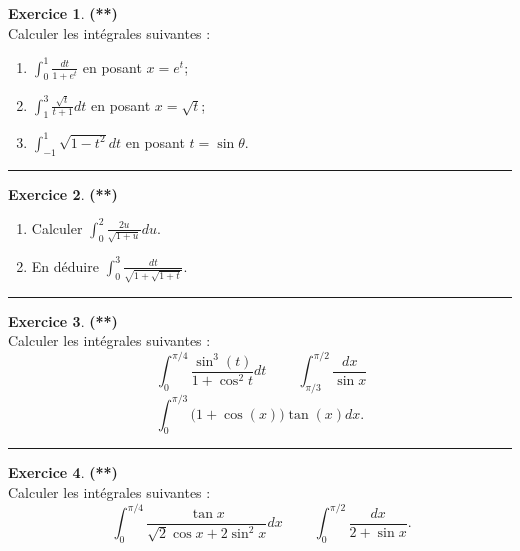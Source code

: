 \documentclass[a4paper,11pt]{article}
\theoremstyle{definition}
\newtheorem{exo}{Exercice} %
\begin{document}
\begin{minipage}{1\linewidth}
\begin{minipage}[t]{0.48\linewidth}
\begin{exo}\textbf{(**)}\quad\\[0.2cm]
	
Calculer les intégrales suivantes :
\begin{enumerate}
	\item  $\displaystyle \int_0^1\frac{dt}{1+e^t}$ en posant $x=e^t$;
	\item $\displaystyle \int_1^3\frac{\sqrt t}{t+1}dt$ en posant $x=\sqrt t$;
	\item $\displaystyle \int_{-1}^1 \sqrt{1-t^2}dt$ en posant $t=\sin\theta$.
\end{enumerate}
	
	
	\centering
	\rule{1\linewidth}{0.6pt}
\end{exo}

\begin{exo}\textbf{(**)}\quad\\[0.2cm]
	\begin{enumerate}
		\item Calculer $\displaystyle\int_0^2 \frac{2u}{\sqrt{1+u}}du$.
		\item En déduire $\displaystyle \int_0^{3}\frac{dt}{\sqrt{1+\sqrt{1+t}}}$.
	\end{enumerate}	
	
	
	\centering
	\rule{1\linewidth}{0.6pt}
\end{exo}

\begin{exo}\textbf{(**)}\quad\\[0.2cm]
	Calculer les intégrales suivantes :
	$$\ \int_0^{\pi/4}\frac{\sin^3(t)}{1+\cos^2 t}dt\quad\quad\ \int_{\pi/3}^{\pi/2}\frac{dx}{\sin x}$$ $$ \int_0^{\pi/3}\big(1+\cos(x)\big)\tan(x)dx.$$
	
	\centering
	\rule{1\linewidth}{0.6pt}
\end{exo}




\end{minipage}	
\hfill\vrule\hfill
\begin{minipage}[t]{0.48\linewidth}
\raggedright



\begin{exo}\textbf{(**)}\quad\\[0.1cm]
	Calculer les intégrales suivantes :
	$$\ \int_0^{\pi/4}\frac{\tan x}{\sqrt 2\cos x+2\sin^2 x}dx\quad\quad\ \int_0^{\pi/2}\frac{dx}{2+\sin x}.$$
	

\end{exo}
\end{minipage}
\end{minipage}
\end{document}
